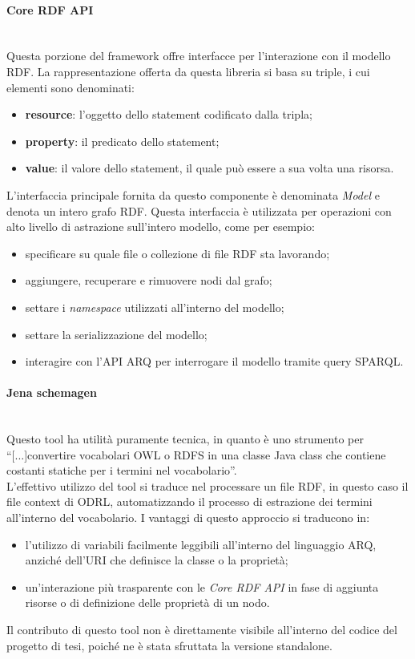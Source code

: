 \documentclass[12pt,a4paper,twoside]{book}
\begin{document}
\paragraph{Core RDF API}\mbox{}\\
Questa porzione del framework offre interfacce per l'interazione con il modello RDF. La rappresentazione offerta da questa libreria si basa su triple, i cui elementi sono denominati:
\begin{itemize}
\item \textbf{resource}: l'oggetto dello statement codificato dalla tripla;
\item \textbf{property}: il predicato dello statement;
\item \textbf{value}: il valore dello statement, il quale può essere a sua volta una risorsa.
\end{itemize}
L'interfaccia principale fornita da questo componente è denominata \textit{Model} e denota un intero grafo RDF. Questa interfaccia è utilizzata per operazioni con alto livello di astrazione sull'intero modello, come per esempio:
\begin{itemize}
\item specificare su quale file o collezione di file RDF sta lavorando;
\item aggiungere, recuperare e rimuovere nodi dal grafo;
\item settare i \textit{namespace} utilizzati all'interno del modello;
\item settare la serializzazione del modello;
\item interagire con l'API ARQ per interrogare il modello tramite query SPARQL.
\end{itemize}
\paragraph{Jena schemagen}\mbox{}\\
Questo tool ha utilità puramente tecnica, in quanto è uno strumento per ``[...]convertire vocabolari OWL o RDFS in una classe Java class che contiene costanti statiche per i termini nel vocabolario''.\\
L'effettivo utilizzo del tool si traduce nel processare un file RDF, in questo caso il file context di ODRL\cite{ODRLContext}, automatizzando il processo di estrazione dei termini all'interno del vocabolario. I vantaggi di questo approccio si traducono in:
\begin{itemize}
\item l'utilizzo di variabili facilmente leggibili all'interno del linguaggio ARQ, anziché dell'URI che definisce la classe o la proprietà;
\item un'interazione più trasparente con le \textit{Core RDF API} in fase di aggiunta risorse o di definizione delle proprietà di un nodo.
\end{itemize}
Il contributo di questo tool non è direttamente visibile all'interno del codice del progetto di tesi, poiché ne è stata sfruttata la versione standalone.
\end{document}
